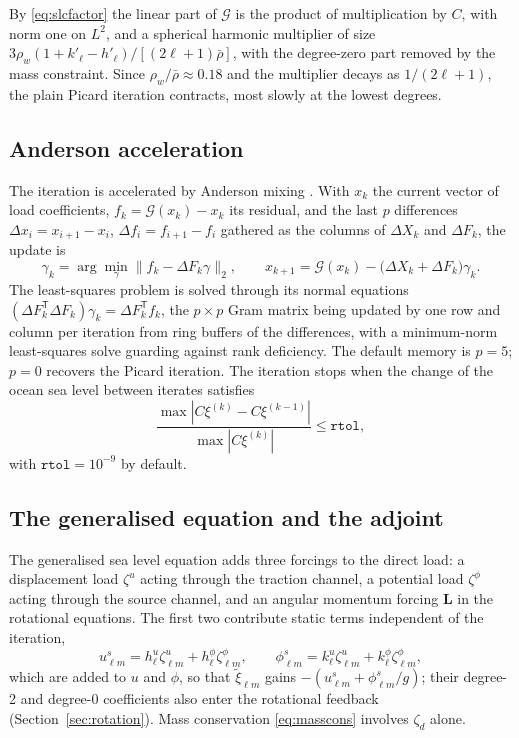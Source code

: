 \documentclass[11pt,a4paper]{article}
\numberwithin{equation}{section}
\begin{document}
By \eqref{eq:slcfactor} the linear part of $\mathcal{G}$ is the product of
multiplication by $C$, with norm one on $L^{2}$, and a spherical harmonic
multiplier of size $3\rho_{w}(1+k'_{\ell}-h'_{\ell})/[(2\ell+1)\bar\rho]$, with
the degree-zero part removed by the mass constraint. Since
$\rho_{w}/\bar\rho\approx0.18$ and the multiplier decays as $1/(2\ell+1)$,
the plain Picard iteration contracts, most slowly at the lowest degrees.

\subsection{Anderson acceleration}

The iteration is accelerated by Anderson mixing \citep{WalkerNi2011}. With $x_{k}$ the current
vector of load coefficients, $f_{k}=\mathcal{G}(x_{k})-x_{k}$ its residual, and
the last $p$ differences $\Delta x_{i}=x_{i+1}-x_{i}$, $\Delta f_{i}=f_{i+1}-f_{i}$
gathered as the columns of $\Delta X_{k}$ and $\Delta F_{k}$, the update is
\begin{equation}
\gamma_{k} = \arg\min_{\gamma}\big\|f_{k}-\Delta F_{k}\gamma\big\|_{2},\qquad
x_{k+1} = \mathcal{G}(x_{k}) - \big(\Delta X_{k}+\Delta F_{k}\big)\gamma_{k}.
\label{eq:anderson}
\end{equation}
The least-squares problem is solved through its normal equations
$(\Delta F_{k}^{\mathsf T}\Delta F_{k})\gamma_{k}=\Delta F_{k}^{\mathsf T}f_{k}$,
the $p\times p$ Gram matrix being updated by one row and column per iteration
from ring buffers of the differences, with a minimum-norm least-squares solve
guarding against rank deficiency. The default memory is $p=5$; $p=0$ recovers
the Picard iteration. The iteration stops when the change of the ocean sea level
between iterates satisfies
\begin{equation}
\frac{\max|C\xi^{(k)}-C\xi^{(k-1)}|}{\max|C\xi^{(k)}|}\le\texttt{rtol},
\end{equation}
with $\texttt{rtol}=10^{-9}$ by default.

\subsection{The generalised equation and the adjoint}
\label{sec:generalised}

The generalised sea level equation adds three forcings to the direct load: a
displacement load $\zeta^{u}$ acting through the traction channel, a potential
load $\zeta^{\phi}$ acting through the source channel, and an angular momentum
forcing $\mathbf{L}$ in the rotational equations. The first two contribute static
terms independent of the iteration,
\begin{equation}
u^{s}_{\ell m} = h^{u}_{\ell}\zeta^{u}_{\ell m} + h^{\phi}_{\ell}\zeta^{\phi}_{\ell m},\qquad
\phi^{s}_{\ell m} = k^{u}_{\ell}\zeta^{u}_{\ell m} + k^{\phi}_{\ell}\zeta^{\phi}_{\ell m},
\end{equation}
which are added to $u$ and $\phi$, so that
$\tilde\xi_{\ell m}$ gains $-(u^{s}_{\ell m}+\phi^{s}_{\ell m}/g)$; their
degree-2 and degree-0 coefficients also enter the rotational feedback
(Section~\ref{sec:rotation}). Mass conservation \eqref{eq:masscons} involves
$\zeta_{d}$ alone.
\end{document}
